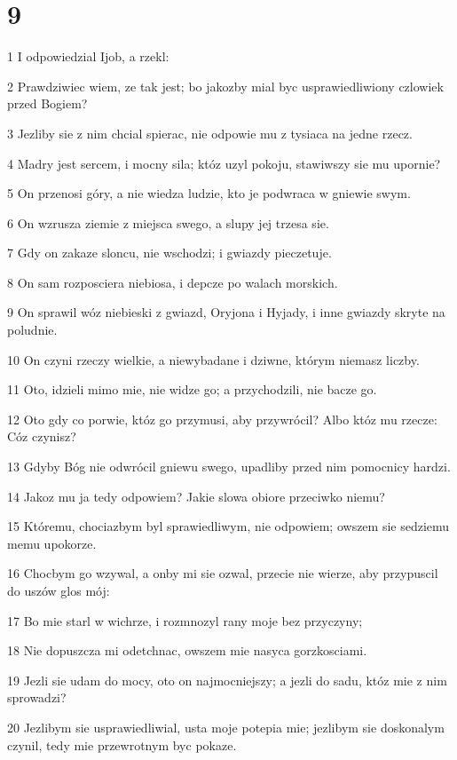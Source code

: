\chapter{9}

\par 1 I odpowiedzial Ijob, a rzekl:
\par 2 Prawdziwiec wiem, ze tak jest; bo jakozby mial byc usprawiedliwiony czlowiek przed Bogiem?
\par 3 Jezliby sie z nim chcial spierac, nie odpowie mu z tysiaca na jedne rzecz.
\par 4 Madry jest sercem, i mocny sila; któz uzyl pokoju, stawiwszy sie mu upornie?
\par 5 On przenosi góry, a nie wiedza ludzie, kto je podwraca w gniewie swym.
\par 6 On wzrusza ziemie z miejsca swego, a slupy jej trzesa sie.
\par 7 Gdy on zakaze sloncu, nie wschodzi; i gwiazdy pieczetuje.
\par 8 On sam rozposciera niebiosa, i depcze po walach morskich.
\par 9 On sprawil wóz niebieski z gwiazd, Oryjona i Hyjady, i inne gwiazdy skryte na poludnie.
\par 10 On czyni rzeczy wielkie, a niewybadane i dziwne, którym niemasz liczby.
\par 11 Oto, idzieli mimo mie, nie widze go; a przychodzili, nie bacze go.
\par 12 Oto gdy co porwie, któz go przymusi, aby przywrócil? Albo któz mu rzecze: Cóz czynisz?
\par 13 Gdyby Bóg nie odwrócil gniewu swego, upadliby przed nim pomocnicy hardzi.
\par 14 Jakoz mu ja tedy odpowiem? Jakie slowa obiore przeciwko niemu?
\par 15 Któremu, chociazbym byl sprawiedliwym, nie odpowiem; owszem sie sedziemu memu upokorze.
\par 16 Chocbym go wzywal, a onby mi sie ozwal, przecie nie wierze, aby przypuscil do uszów glos mój:
\par 17 Bo mie starl w wichrze, i rozmnozyl rany moje bez przyczyny;
\par 18 Nie dopuszcza mi odetchnac, owszem mie nasyca gorzkosciami.
\par 19 Jezli sie udam do mocy, oto on najmocniejszy; a jezli do sadu, któz mie z nim sprowadzi?
\par 20 Jezlibym sie usprawiedliwial, usta moje potepia mie; jezlibym sie doskonalym czynil, tedy mie przewrotnym byc pokaze.
